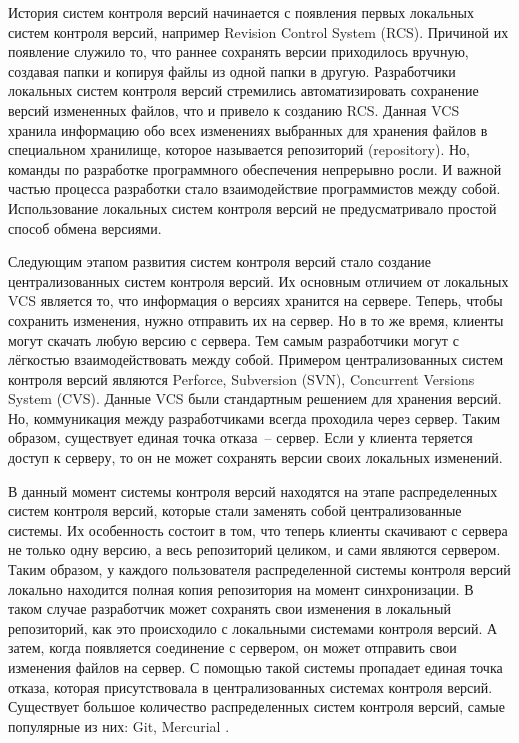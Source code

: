 История систем контроля версий начинается с появления первых локальных систем контроля версий, например Revision Control System (RCS). Причиной их появление служило то, что раннее сохранять версии приходилось вручную, создавая папки и копируя файлы из одной папки в другую. Разработчики локальных систем контроля версий стремились автоматизировать сохранение версий измененных файлов, что и привело к созданию RCS. Данная VCS хранила информацию обо всех изменениях выбранных для хранения файлов в специальном хранилище, которое называется репозиторий (repository). Но, команды по разработке программного обеспечения непрерывно росли. И важной частью процесса разработки стало взаимодействие программистов между собой. Использование локальных систем контроля версий не предусматривало простой способ обмена версиями.

Следующим этапом развития систем контроля версий стало создание централизованных систем контроля версий. Их основным отличием от локальных VCS является то, что информация о версиях хранится на сервере. Теперь, чтобы сохранить изменения, нужно отправить их на сервер. Но в то же время, клиенты могут скачать любую версию с сервера. Тем самым разработчики могут с лёгкостью взаимодействовать между собой. Примером централизованных систем контроля версий являются Perforce, Subversion (SVN), Concurrent Versions System (CVS). Данные VCS были стандартным решением для хранения версий. Но, коммуникация между разработчиками всегда проходила через сервер. Таким образом, существует единая точка отказа~-- сервер. Если у клиента теряется доступ к серверу, то он не может сохранять версии своих локальных изменений.

В данный момент системы контроля версий находятся на этапе распределенных систем контроля версий, которые стали заменять собой централизованные системы. Их особенность состоит в том, что теперь клиенты скачивают с сервера не только одну версию, а весь репозиторий целиком, и сами являются сервером. Таким образом, у каждого пользователя распределенной системы контроля версий локально находится полная копия репозитория на момент синхронизации. В таком случае разработчик может сохранять свои изменения в локальный репозиторий, как это происходило с локальными системами контроля версий. А затем, когда появляется соединение с сервером, он может отправить свои изменения файлов на сервер. С помощью такой системы пропадает единая точка отказа, которая присутствовала в централизованных системах контроля версий. Существует большое количество распределенных систем контроля версий, самые популярные из них: Git, Mercurial \cite{best-vcs}. 

